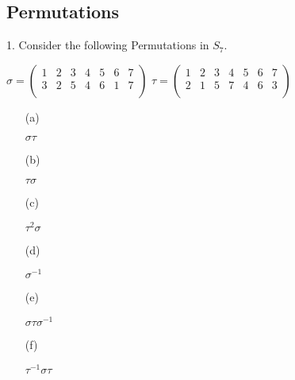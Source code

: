 \subsection{Permutations} %
\begin{mdframed}[style=darkQuesion]
  1. Consider the following Permutations in $S_7$.
  \begin{multicols}{2}
    $\sigma=
      \begin{pmatrix}
        1 & 2 & 3 & 4 & 5 & 6 & 7 \\
        3 & 2 & 5 & 4 & 6 & 1 & 7 \\
      \end{pmatrix}$
    $\tau=
      \begin{pmatrix}
        1 & 2 & 3 & 4 & 5 & 6 & 7 \\
        2 & 1 & 5 & 7 & 4 & 6 & 3 \\
      \end{pmatrix}$
  \end{multicols}
  \vspace{.25in}
  \begin{multicols}{4}
    \begin{itemize}
      \item [(a)]{$\sigma\tau$

            }
      \item [(b)]{$\tau\sigma$

            }
      \item [(c)]{$\tau^2\sigma$

            }
      \item [(d)]{$\sigma^{-1}$

            }
      \item [(e)]{$\sigma\tau\sigma^{-1}$

            }
      \item [(f)]{$\tau^{-1}\sigma\tau$

            }
    \end{itemize}
  \end{multicols}
\end{mdframed}

